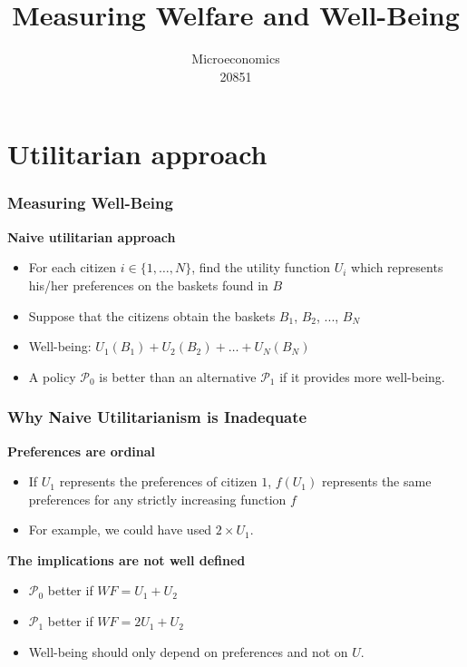 \documentclass[handout]{beamer}
\title{Measuring Welfare and Well-Being}
\author{Microeconomics \\ 20851}
\date{}
\newcommand{\mcl}{\mathcal}
\newcommand{\mdp}{\medskip \pause}
\begin{document}
\frame{\titlepage}

\section[Outline]{}
\frame{\tableofcontents}

\section{}

\section{Utilitarian approach}

\begin{frame}\frametitle{Measuring Well-Being}

\textbf{Naive utilitarian approach}

\begin{itemize} \item For each citizen $i
\in \{1,\ldots,N\}$, find the utility function $U_i$ which represents his/her preferences on the baskets found in $B$
\item Suppose that the citizens obtain the baskets $B_1$, $B_2$, ..., $B_N$

\item Well-being: $U_1(B_1) + U_2(B_2) + \ldots + U_N(B_N)$
\item A policy $\mcl P_0$ is better than an alternative $\mcl P_1$ if it provides more well-being.
\end{itemize}
\end{frame}
 

\begin{frame}\frametitle{Why Naive Utilitarianism is Inadequate}
\textbf{Preferences are ordinal} \begin{itemize}\item If $U_1$ represents the preferences of citizen $1$, $f(U_1)$ represents the same preferences for any strictly increasing function $f$ \item For example, we could have used $2
\times U_1$. \end{itemize}\mdp

\textbf{The implications are not well defined} \begin{itemize} \item  $\mcl P_0$ better if $WF = U_1 + U_2$
\item $\mcl P_1$ better if $WF = 2U_1 + U_2$ \item Well-being should only depend on preferences and not on $U$. \end{itemize}

\end{frame}
\end{document}
